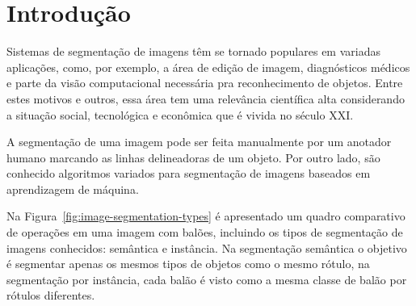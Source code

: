 \chapter{Introdução}\label{cap:introducao}

Sistemas de segmentação de imagens têm se tornado populares em
variadas aplicações, como, por exemplo, a área de edição de imagem,
diagnósticos médicos e parte da visão computacional necessária pra
reconhecimento de objetos. Entre estes motivos e outros, essa área tem
uma relevância científica alta considerando a situação social,
tecnológica e econômica que é vivida no século XXI.\@

A segmentação de uma imagem pode ser feita manualmente por um anotador
humano marcando as linhas delineadoras de um objeto. Por outro lado,
são conhecido algoritmos variados para segmentação de imagens baseados
em aprendizagem de máquina.

Na Figura~\ref{fig:image-segmentation-types} é apresentado um quadro
comparativo de operações em uma imagem com balões, incluindo os tipos
de segmentação de imagens conhecidos: semântica e instância. Na
segmentação semântica o objetivo é segmentar apenas os mesmos tipos de
objetos como o mesmo rótulo, na segmentação por instância, cada balão
é visto como a mesma classe de balão por rótulos diferentes.

\begin{figure}[h!]
        \captionsetup{width=16cm}
		\centering
\end{figure}


